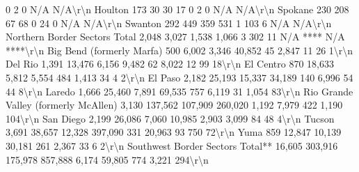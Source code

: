 \documentclass[
  12pt,
]{book}
\newenvironment{Shaded}{\begin{snugshade}}{\end{snugshade}}
\begin{document}
\begin{Shaded}
\begin{Highlighting}[]
            0                2               0           N/A     N/A\textbackslash{}r\textbackslash{}n Houlton                                           173                 30                       30                      17                0                2               0           N/A     N/A\textbackslash{}r\textbackslash{}n Spokane                                           230                208                       67                      68                0               24               0           N/A     N/A\textbackslash{}r\textbackslash{}n Swanton                                           292                449                      359                     531                1              103               6           N/A     N/A\textbackslash{}r\textbackslash{}n Northern Border Sectors Total                    2,048              3,027                    1,538                   1,066               3              302              11        N/A **** N/A ****\textbackslash{}r\textbackslash{}n Big Bend (formerly Marfa)                         500               6,002                   3,346                   40,852              45             2,847             11            26      1\textbackslash{}r\textbackslash{}n Del Rio                                          1,391             13,476                    6,156                   9,482              62             8,022             12            99     18\textbackslash{}r\textbackslash{}n El Centro                                         870              18,633                    5,812                   5,554             484             1,413             34             4      2\textbackslash{}r\textbackslash{}n El Paso                                          2,182             25,193                   15,337                  34,189             140             6,996             54            44      8\textbackslash{}r\textbackslash{}n Laredo                                           1,666             25,460                    7,891                  69,535             757             6,119             31          1,054    83\textbackslash{}r\textbackslash{}n Rio Grande Valley (formerly McAllen)             3,130            137,562                  107,909                260,020             1,192            7,979            422          1,190   104\textbackslash{}r\textbackslash{}n San Diego                                        2,199             26,086                    7,060                  10,985            2,903            3,099             84            48      4\textbackslash{}r\textbackslash{}n Tucson                                           3,691             38,657                   12,328                397,090              331            20,963             93           750     72\textbackslash{}r\textbackslash{}n Yuma                                              859              12,847                   10,139                  30,181             261             2,367             33             6      2\textbackslash{}r\textbackslash{}n Southwest Border Sectors Total**                16,605            303,916                  175,978                857,888             6,174           59,805            774          3,221   294\textbackslash{}r\textbackslash{}n 
\end{Highlighting}
\end{Shaded}
\end{document}
